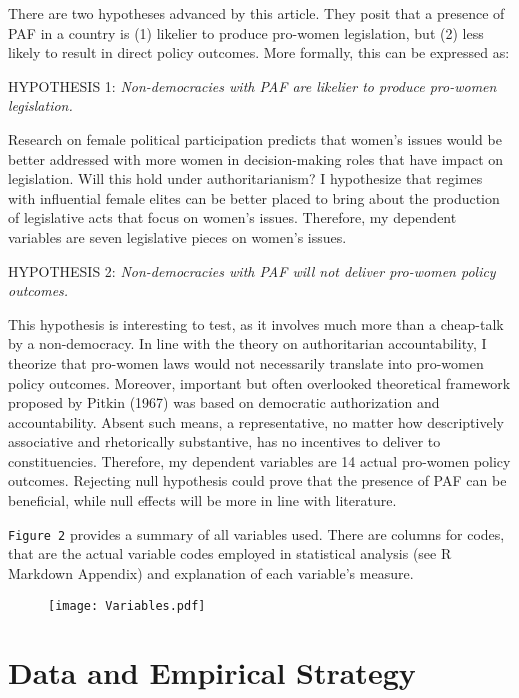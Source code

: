 \documentclass[12pt]{article}
\begin{document}
There are two hypotheses advanced by this article. They posit that a presence of PAF in a country is (1) likelier to produce pro-women legislation, but (2) less likely to result in direct policy outcomes. More formally, this can be expressed as: 

HYPOTHESIS 1: \textit{Non-democracies with PAF are likelier to produce pro-women legislation.}

Research on female political participation predicts that women's issues would be better addressed with more women in decision-making roles that have impact on legislation. Will this hold under authoritarianism? I hypothesize that regimes with influential female elites can be better placed to bring about the production of legislative acts that focus on women's issues. Therefore, my dependent variables are seven legislative pieces on women's issues.    

HYPOTHESIS 2: \textit{Non-democracies with PAF will not deliver pro-women policy outcomes.}

This hypothesis is interesting to test, as it involves much more than a cheap-talk by a non-democracy. In line with the theory on authoritarian accountability, I theorize that pro-women laws would not necessarily translate into pro-women policy outcomes. Moreover, important but often overlooked theoretical framework proposed by Pitkin (1967) was based on democratic authorization and accountability. Absent such means, a representative, no matter how descriptively associative and rhetorically substantive, has no incentives to deliver to constituencies. Therefore, my dependent variables are 14 actual pro-women policy outcomes. Rejecting null hypothesis could prove that the presence of PAF can be beneficial, while null effects will be more in line with literature. 

\texttt{Figure 2} provides a summary of all variables used. There are columns for codes, that are the actual variable codes employed in statistical analysis (see R Markdown Appendix) and explanation of each variable's measure. 

\begin{figure}[htp]
\centering
\texttt{[image: Variables.pdf]}
\label{fig:}
\end{figure}

\section*{Data and Empirical Strategy}
\end{document}
